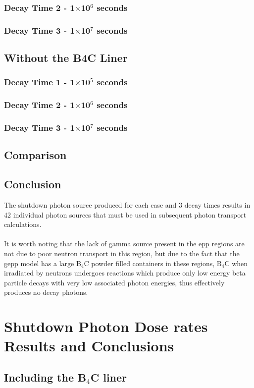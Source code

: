\documentclass[12pt]{article}
\begin{document}
\subsubsection{Decay Time 2 - 1$\times$10$^{6}$ seconds}
\subsubsection{Decay Time 3 - 1$\times$10$^{7}$ seconds}
\subsection{Without the B4C Liner}
\subsubsection{Decay Time 1 - 1$\times$10$^{5}$ seconds}
\subsubsection{Decay Time 2 - 1$\times$10$^{6}$ seconds}
\subsubsection{Decay Time 3 - 1$\times$10$^{7}$ seconds}
\subsection{Comparison}
\subsection{Conclusion}
The shutdown photon source produced for each case and 3 decay times results in
42 individual photon sources that must be used in subsequent photon transport
calculations.
\\
\\
It is worth noting that the lack of gamma source present in the \gls{epp}
regions are not due to poor neutron transport in this region, but due to the
fact that the \gls{gepp} model has a large B$_4$C powder filled containers
in these regions, B$_4$C when irradiated by neutrons undergoes reactions
which produce only low energy beta particle decays with very low associated
photon energies, thus effectively produces no decay photons.
\newpage
\clearpage
\section{Shutdown Photon Dose rates Results and Conclusions}
\subsection{Including the B$_4$C liner}
\end{document}
